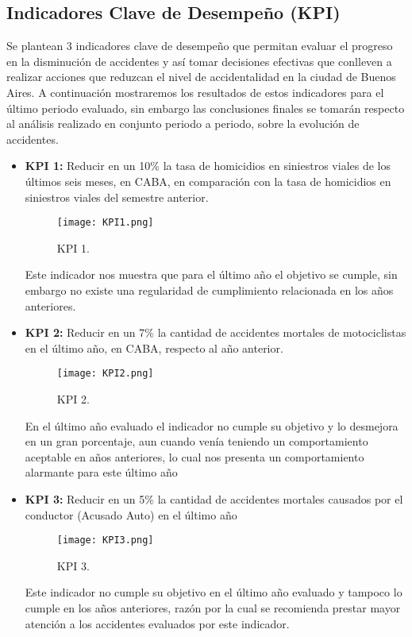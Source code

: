 \documentclass[12pt]{article}
\begin{document}
\subsection{Indicadores Clave de Desempeño (KPI)}
Se plantean 3 indicadores clave de desempeño que permitan evaluar el progreso en la disminución de accidentes y así tomar decisiones efectivas que conlleven a realizar acciones que reduzcan el nivel de accidentalidad en la ciudad de Buenos Aires. A continuación mostraremos los resultados de estos indicadores para el último periodo evaluado, sin embargo las conclusiones finales se tomarán respecto al análisis realizado en conjunto periodo a periodo, sobre la evolución de accidentes. 
\begin{itemize}
    \item \textbf{KPI 1:} Reducir en un 10\% la tasa de homicidios en siniestros viales de los últimos seis meses, en CABA, en comparación con la tasa de homicidios en siniestros viales del semestre anterior.

\begin{figure}[H]
  \centering
  \texttt{[image: KPI1.png]}
  \caption{KPI 1.}
  \label{fig:KPI 1}
\end{figure}

    Este indicador nos muestra que para el último año el objetivo se cumple, sin embargo no existe una regularidad de cumplimiento relacionada en los años anteriores.
    
    \item \textbf{KPI 2:} Reducir en un 7\% la cantidad de accidentes mortales de motociclistas en el último año, en CABA, respecto al año anterior.

\begin{figure}[H]
  \centering
  \texttt{[image: KPI2.png]}
  \caption{KPI 2.}
  \label{fig:KPI 2}
\end{figure}

En el último año evaluado el indicador no cumple su objetivo y lo desmejora en un gran porcentaje, aun cuando venía teniendo un comportamiento aceptable en años anteriores, lo cual nos presenta un comportamiento alarmante para este último año 

    \item \textbf{KPI 3:} Reducir en un 5\% la cantidad de accidentes mortales causados por el conductor (Acusado Auto) en el último año

\begin{figure}[H]
  \centering
  \texttt{[image: KPI3.png]}
  \caption{KPI 3.}
  \label{fig:KPI 3}
\end{figure}

    Este indicador no cumple su objetivo en el último año evaluado y tampoco lo cumple en los años anteriores, razón por la cual se recomienda prestar mayor atención a los accidentes evaluados por este indicador. 
    
\end{itemize}
\end{document}
